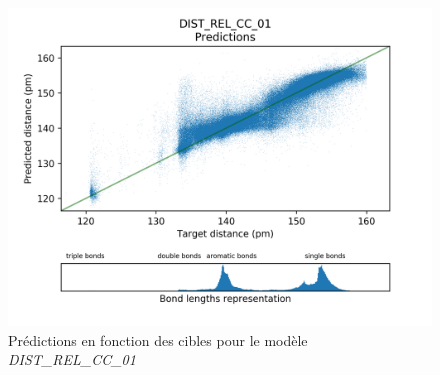 \begin{figure}[!h]
	\centering
	
	\includegraphics[scale=0.8]{../figures/DIST_REL_CC_01/DIST_REL_CC_01_preds_targets.png}	
	
	\caption{Prédictions en fonction des cibles pour le modèle \emph{DIST\_REL\_CC\_01}}
	
\end{figure}



